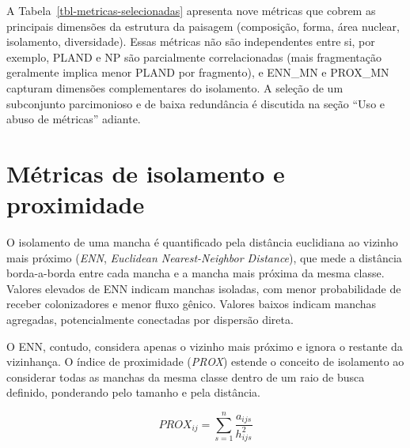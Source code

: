 \documentclass[
  portuguese,
  11pt,
  a4paper,
  open=any]{scrbook}
\begin{document}
A Tabela~\ref{tbl-metricas-selecionadas} apresenta nove métricas que
cobrem as principais dimensões da estrutura da paisagem (composição,
forma, área nuclear, isolamento, diversidade). Essas métricas não são
independentes entre si, por exemplo, PLAND e NP são parcialmente
correlacionadas (mais fragmentação geralmente implica menor PLAND por
fragmento), e ENN\_MN e PROX\_MN capturam dimensões complementares do
isolamento. A seleção de um subconjunto parcimonioso e de baixa
redundância é discutida na seção ``Uso e abuso de métricas'' adiante.

\section{Métricas de isolamento e
proximidade}\label{muxe9tricas-de-isolamento-e-proximidade}

O isolamento de uma mancha é quantificado pela distância euclidiana ao
vizinho mais próximo (\emph{ENN}, \emph{Euclidean Nearest-Neighbor
Distance}), que mede a distância borda-a-borda entre cada mancha e a
mancha mais próxima da mesma classe. Valores elevados de ENN indicam
manchas isoladas, com menor probabilidade de receber colonizadores e
menor fluxo gênico. Valores baixos indicam manchas agregadas,
potencialmente conectadas por dispersão direta.

O ENN, contudo, considera apenas o vizinho mais próximo e ignora o
restante da vizinhança. O índice de proximidade (\emph{PROX}) estende o
conceito de isolamento ao considerar todas as manchas da mesma classe
dentro de um raio de busca definido, ponderando pelo tamanho e pela
distância.

\[
PROX_{ij} = \sum_{s=1}^{n} \frac{a_{ijs}}{h_{ijs}^2}
\]
\end{document}
